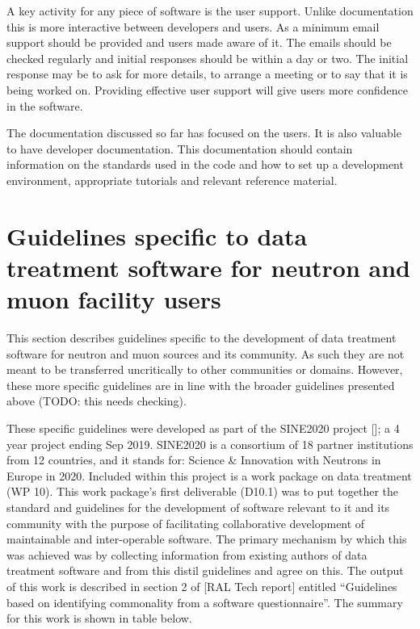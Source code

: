\documentclass[jnr]{iosart2x}
\begin{document}
A key activity for any piece of software is the user support.
Unlike documentation this is more interactive between developers and users.
As a minimum email support should be provided and users made aware of it.
The emails should be checked regularly and initial responses should be within a day or two.
The initial response may be to ask for more details, to arrange a meeting or to say that it is being worked on.
Providing effective user support will give users more confidence in the software.

The documentation discussed so far has focused on the users.
It is also valuable to have developer documentation.
This documentation should contain information on the standards used in the code and how to set up a development environment, appropriate tutorials and relevant reference material.

\section{Guidelines specific to data treatment software for neutron and muon facility users}
\label{SINE2020}

This section describes guidelines specific to the development of data treatment software for neutron and muon sources and its community.
As such they are not meant to be transferred uncritically to other communities or domains.
However, these more specific guidelines are in line with the broader guidelines presented above (TODO: this needs checking). 

These specific guidelines were developed as part of the SINE2020 project []; a 4 year project ending Sep 2019.
SINE2020 is a consortium of 18 partner institutions from 12 countries, and it stands for: Science \& Innovation with Neutrons in Europe in 2020.
Included within this project is a work package on data treatment (WP 10).
This work package’s first deliverable (D10.1) was to put together the standard and guidelines for the development of software relevant to it and its community with the purpose of facilitating collaborative development of maintainable and inter-operable software.
The primary mechanism by which this was achieved was by collecting information from existing authors of data treatment software and from this distil guidelines and agree on this.
The output of this work is described in section 2 of [RAL Tech report] entitled “Guidelines based on identifying commonality from a software questionnaire”.
The summary for this work is shown in table below. 
\end{document}
